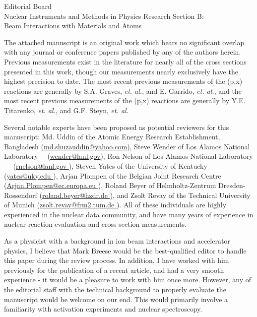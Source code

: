 \documentclass{letter} %
\begin{document}
\begin{letter}{Editorial Board \\
Nuclear Instruments and Methods in Physics Research Section B: \\
Beam Interactions with Materials and Atoms}
 
\noindent The attached manuscript is an original work which bears no significant overlap with any journal or conference papers published by any of the authors herein. Previous measurements exist in the literature for nearly all of the cross sections presented in this work, though our measurements nearly exclusively have the highest precision to date.
The most recent previous measurements of the (p,x) reactions are generally by  S.A. Graves, \emph{et. al.}\footnotemark[7], and E. Garrido, \emph{et. al.}\footnotemark[8], and the most recent previous measurements of the (p,x) reactions are generally by Y.E. Titarenko, \emph{et. al.}\footnotemark[9], and G.F. Steyn, \emph{et. al.}\footnotemark[10]

Several notable experts have been proposed as potential reviewers for this manuscript: Md. Uddin of the Atomic Energy Research Establishment, Bangladesh (\url{md.shuzauddin@yahoo.com}), Steve Wender of Los Alamos National Laboratory  (\url{wender@lanl.gov}), Ron Nelson of Los Alamos National Laboratory  	   (\url{rnelson@lanl.gov	}), Steven Yates of the University of Kentucky	  (\url{yates@uky.edu	}), Arjan Plompen of the Belgian Joint Research Centre	   (\url{Arjan.Plompen@ec.europa.eu	}), Roland Beyer of Helmholtz-Zentrum Dresden-Rossendorf	  (\url{roland.beyer@hzdr.de	}), and Zsolt Revay of the Technical University of Munich	  (\url{zsolt.revay@frm2.tum.de	}).  All of these individuals are highly experienced in the nuclear data community, and have many years of experience in nuclear reaction evaluation and cross section measurements.

As a physicist with a background in ion beam interactions and accelerator physics, I believe that Mark Breese would be the best-qualified editor to handle this paper during the review process. In addition, I have worked with him previously for the publication of a recent article\footnotemark[11], and had a very smooth experience - it would be a pleasure to work with him once more. However, any of the editorial staff with the technical background to properly evaluate the manuscript would be welcome on our end.  This would primarily involve a familiarity with activation experiments and nuclear spectroscopy. 




\end{letter}
\end{document}
